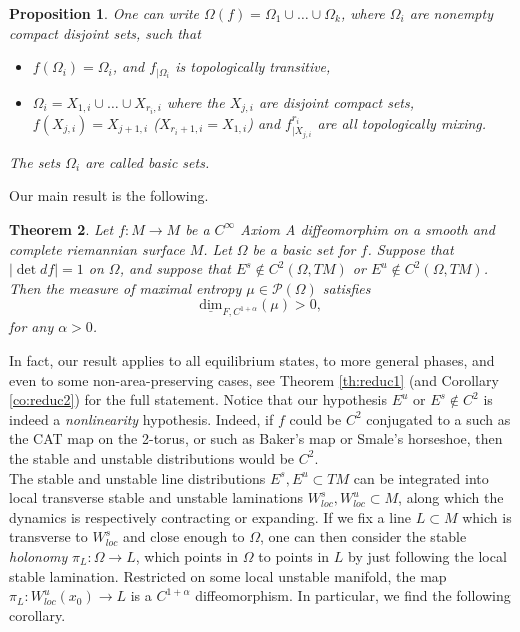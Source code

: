 \documentclass[a4paper]{article}
\newtheorem{theorem}{Theorem}[section]
\newtheorem{proposition}[theorem]{Proposition}
\theoremstyle{definition}
\begin{document}
\begin{proposition}\label{prop:basicsets}
One can write $\Omega(f) = \Omega_1 \cup \dots \cup \Omega_k$, where $\Omega_i$ are nonempty compact disjoint sets, such that 
\begin{itemize}
    \item $f(\Omega_i)=\Omega_i$, and $f_{|\Omega_i}$ is topologically transitive,
    \item $\Omega_i = X_{1,i} \cup \dots \cup X_{r_i,i}$ where the $X_{j,i}$ are disjoint compact sets,  $f(X_{j,i}) = X_{j+1,i}$ ($X_{r_i+1,i}=X_{1,i}$) and $f^{r_i}_{| X_{j,i}}$ are all topologically mixing.
\end{itemize}
The sets $\Omega_i$ are called basic sets.
\end{proposition}

Our main result is the following.

\begin{theorem}\label{th:main1}
Let $f:M \rightarrow M$ be a $C^\infty$ Axiom A diffeomorphim on a smooth and complete riemannian surface $M$. Let $\Omega$ be a basic set for $f$. Suppose that $|\det df| = 1$ on $\Omega$, and suppose that $E^s \notin C^2(\Omega,TM)$ or $E^u \notin C^2(\Omega,TM)$. Then the measure of maximal entropy $\mu \in \mathcal{P}(\Omega)$ satisfies
$$ \underline{\text{dim}}_{F,C^{1+\alpha}}(\mu) > 0,$$
for any $\alpha>0$.
\end{theorem}

In fact, our result applies to all equilibrium states, to more general phases, and even to some non-area-preserving cases, see Theorem \ref{th:reduc1} (and Corollary \ref{co:reduc2}) for the full statement. Notice that our hypothesis $E^u \text{ or } E^s \notin C^2$ is indeed a \emph{nonlinearity} hypothesis. Indeed, if $f$ could be $C^2$ conjugated to a  such as the CAT map on the 2-torus, or such as Baker's map or Smale's horseshoe, then the stable and unstable distributions would be $C^2$. \\

The stable and unstable line distributions $E^s,E^u \subset TM$ can be integrated into local transverse stable and unstable laminations $W^s_{loc},W^u_{loc} \subset M$, along which the dynamics is respectively contracting or expanding. If we fix a line $L \subset M$ which is transverse to $W^s_{loc}$ and close enough to $\Omega$, one can then consider the stable \emph{holonomy} $\pi_L : \Omega \rightarrow L$, which  points in $\Omega$ to points in $L$ by just following the local stable lamination. Restricted on some local unstable manifold, the map $\pi_L : W^u_{loc}(x_0)  \rightarrow L$ is a $C^{1+\alpha}$ diffeomorphism. In particular, we find the following corollary.
\end{document}
